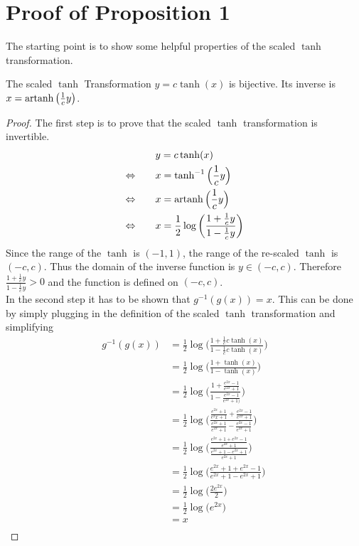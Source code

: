 \section{Proof of Proposition 1}\label{proof:log_abs_det_jacobian}
The starting point is to show some helpful properties of the scaled $\tanh$ transformation.
\begin{lemma}\label{lem:tanh_bijective}
The scaled $\tanh$ Transformation $y = c \tanh (x)$ is bijective. Its inverse is $x = \operatorname{artanh} \big(\frac{1}{c}y \big)$.
\end{lemma}
\begin{proof}
The first step is to prove that the scaled $\tanh$ transformation is invertible.
\begin{align}
     & y = c \tanh (x) \nonumber \\
     \Leftrightarrow \qquad & x = \tanh^{-1} \Big(\frac{1}{c}y \Big) \nonumber \\
     \Leftrightarrow \qquad & x = \operatorname{artanh} \Big(\frac{1}{c}y \Big) \nonumber \\
     \Leftrightarrow \qquad & x = \frac{1}{2} \log \bigg( \frac{1 + \frac{1}{c} y}{1 - \frac{1}{c} y } \bigg) \nonumber \\
\end{align}
Since the range of the $\tanh$ is $(-1, 1)$, the range of the re-scaled $\tanh$ is $(-c, c)$. Thus the domain of the inverse function is $y \in (-c, c)$. Therefore $\frac{1 + \frac{1}{c} y}{1 - \frac{1}{c} y } > 0$ and the function is defined on $(-c, c)$.\\
In the second step it has to be shown that $g^{-1}(g(x))=x$. This can be done by simply plugging in the definition of the scaled $\tanh$ transformation and simplifying
\begin{align}
     g^{-1}(g(x)) & = \frac{1}{2} \log \bigg( \frac{1 + \frac{1}{c} c \tanh (x)}{1 - \frac{1}{c} c \tanh (x)} \bigg) \nonumber \\
     & = \frac{1}{2} \log \bigg( \frac{ 1 + \tanh (x) }{ 1 -  \tanh (x) } \bigg) \nonumber \\
     & = \frac{1}{2} \log \bigg( \frac{1 + \frac{e^{2x} - 1}{e^{2x} + 1}}{1 -  \frac{e^{2x} - 1}{e^{2x} + 1)}} \bigg) \nonumber \\
     & = \frac{1}{2} \log \bigg( \frac{\frac{e^{2x} + 1}{ e^2x + 1} + \frac{ e^{2x} - 1 }{ e^{2x} + 1 }}{\frac{ e^{2x} + 1 }{   e^{2x} + 1 } -  \frac{ e^{2x} - 1 }{ e^{2x} + 1 }} \bigg) \nonumber \\
     & = \frac{1}{2} \log \bigg( \frac{\frac{e^{2x} + 1 + e^{2x} - 1 }{ e^{2x} + 1 }}{\frac{ e^{2x} + 1 - e^{2x} + 1 }{ e^{2x} + 1}} \bigg) \nonumber \\
      & = \frac{1}{2} \log \bigg( \frac{e^{2x} + 1 + e^{2x} - 1}{e^{2x} + 1 - e^{2x} + 1} \bigg) \nonumber \\
      & = \frac{1}{2} \log \bigg( \frac{2e^{2x}}{2} \bigg) \nonumber \\
      & = \frac{1}{2} \log \bigg(e^{2x} \bigg) \nonumber \\
      & = x\nonumber \\
\end{align}
\end{proof}

